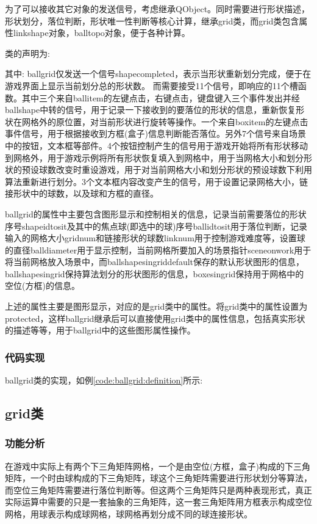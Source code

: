 \documentclass[11pt,twoside]{article} %
\begin{document}
为了可以接收其它对象的发送信号，考虑继承QObject。同时需要进行形状描述，形状划分，落位判断，形状唯一性判断等核心计算，继承grid类，而grid类包含属性linkshape对象，balltopo对象，便于各种计算。

类的声明为:

其中: ballgrid仅发送一个信号shapecompleted，表示当形状重新划分完成，便于在游戏界面上显示当前划分总的形状数。
而需要接受11个信号，即响应的11个槽函数。其中三个来自ballitem的左键点击，右键点击，键盘键入三个事件发出并经ballshape中转的信号，用于记录一下接收到的要落位的形状的信息，重新恢复形状在网格外的原位置，对当前形状进行旋转等操作。一个来自boxitem的左键点击事件信号，用于根据接收到方框(盒子)信息判断能否落位。另外7个信号来自场景中的按钮，文本框等部件。4个按钮控制产生的信号用于游戏开始将所有形状移动到网格外，用于游戏示例将所有形状恢复填入到网格中，用于当网格大小和划分形状的预设球数改变时重设游戏，用于对当前网格大小和划分形状的预设球数下利用算法重新进行划分。3个文本框内容改变产生的信号，用于设置记录网格大小，链接形状中的球数，以及球和方框的直径。

ballgrid的属性中主要包含图形显示和控制相关的信息，记录当前需要落位的形状序号shapeidtosit及其中的焦点球(即选中的球)序号ballidtosit用于落位判断，记录输入的网格大小gridnum和链接形状的球数linknum用于控制游戏难度等，设置球的直径balldiameter用于显示控制，当前网格所要加入的场景指针sceneonwork用于将当前网格放入场景中，而ballshapesingriddefault保存的默认形状图形的信息，ballshapesingrid保持算法划分的形状图形的信息，boxesingrid保持用于网格中的空位(方框)的信息。

上述的属性主要是图形显示，对应的是grid类中的属性。将grid类中的属性设置为protected，这样ballgrid继承后可以直接使用grid类中的属性信息，包括真实形状的描述等等，用于ballgrid中的这些图形属性操作。

\subsubsection{代码实现}
ballgrid类的实现，如例\ref{code:ballgrid:definition}所示:


\subsection{grid类}

\subsubsection{功能分析}
在游戏中实际上有两个下三角矩阵网格，一个是由空位(方框，盒子)构成的下三角矩阵，一个时由球构成的下三角矩阵，球这个三角矩阵需要进行形状划分等算法，而空位三角矩阵需要进行落位判断等。但这两个三角矩阵只是两种表现形式，真正实际运算中需要的只是一套抽象的三角矩阵，这一套三角矩阵用方框表示构成空位网格，用球表示构成球网格，球网格再划分成不同的球连接形状。
\end{document}
